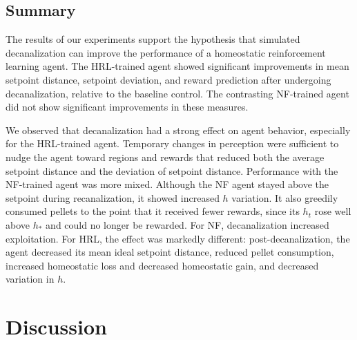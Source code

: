\documentclass[12pt,fleqn]{article}
\begin{document}
\subsection{Summary}

The results of our experiments support the hypothesis that simulated decanalization can improve the performance of a homeostatic reinforcement learning agent. The HRL-trained agent showed significant improvements in mean setpoint distance, setpoint deviation, and reward prediction after undergoing decanalization, relative to the baseline control. The contrasting NF-trained agent did not show significant improvements in these measures.

We observed that decanalization had a strong effect on agent behavior, especially for the HRL-trained agent. Temporary changes in perception were sufficient to nudge the agent toward regions and rewards that reduced both the average setpoint distance and the deviation of setpoint distance. Performance with the NF-trained agent was more mixed. Although the NF agent stayed above the setpoint during recanalization, it showed increased \(h\) variation. It also greedily consumed pellets to the point that it received fewer rewards, since its \(h_t\) rose well above \(h_*\) and could no longer be rewarded. For NF, decanalization increased exploitation. For HRL, the effect was markedly different: post-decanalization, the agent decreased its mean ideal setpoint distance, reduced pellet consumption, increased homeostatic loss and decreased homeostatic gain, and decreased variation in \(h\).

\section{Discussion}\label{model-discussion}


\end{document}
